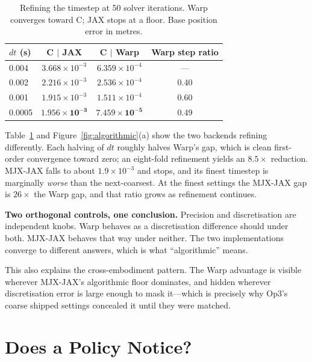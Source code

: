 \documentclass[conference]{IEEEtran}
\newcommand{\tabfont}{\footnotesize}
\begin{document}
\begin{table}[t]
\caption{Refining the timestep at 50 solver iterations. Warp converges
toward C; JAX stops at a floor. Base position error in metres.}
\label{tab:convergence}
\centering
\tabfont
\begin{tabular}{@{}lccc@{}}
\toprule
\textbf{$dt$ (s)} & \textbf{C $|$ JAX} & \textbf{C $|$ Warp} & \textbf{Warp step ratio} \\
\midrule
0.004  & $3.668\!\times\!10^{-3}$ & $6.359\!\times\!10^{-4}$ & --- \\
0.002  & $2.216\!\times\!10^{-3}$ & $2.536\!\times\!10^{-4}$ & 0.40 \\
0.001  & $1.915\!\times\!10^{-3}$ & $1.511\!\times\!10^{-4}$ & 0.60 \\
0.0005 & $\mathbf{1.956\!\times\!10^{-3}}$ & $\mathbf{7.459\!\times\!10^{-5}}$ & 0.49 \\
\bottomrule
\end{tabular}
\end{table}

Table~\ref{tab:convergence} and Figure~\ref{fig:algorithmic}(a) show the
two backends refining differently. Each halving of $dt$ roughly halves
Warp's gap, which is clean first-order convergence toward zero; an
eight-fold refinement yields an $8.5\times$ reduction. MJX-JAX falls to
about $1.9\times10^{-3}$ and stops, and its finest timestep is marginally
\emph{worse} than the next-coarsest. At the finest settings the MJX-JAX
gap is $26\times$ the Warp gap, and that ratio grows as refinement
continues.

\textbf{Two orthogonal controls, one conclusion.} Precision and
discretisation are independent knobs. Warp behaves as a discretisation
difference should under both. MJX-JAX behaves that way under neither. The
two implementations converge to different answers, which is what
``algorithmic'' means.

This also explains the cross-embodiment pattern. The Warp advantage is
visible wherever MJX-JAX's algorithmic floor dominates, and hidden
wherever discretisation error is large enough to mask it---which is
precisely why Op3's coarse shipped settings concealed it until they were
matched.

\section{Does a Policy Notice?}
\label{sec:policy}
\end{document}
